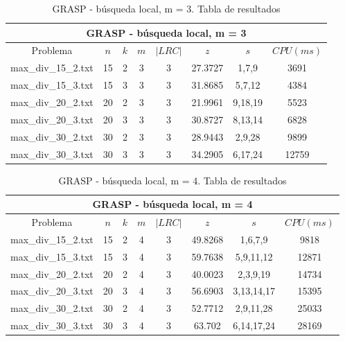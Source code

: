    \begin{table}[h]
   {\small
   \begin{center}
   \begin{tabular}{cccccccc}
      \multicolumn{8}{c}{GRASP - búsqueda local, m = 3} \\
      \hline
      Problema & $n$ & $k$ & $m$ & $|LRC|$ & $z$ & $s$ & $CPU(ms)$ \\
      \hline
      max\_div\_15\_2.txt & 15 & 2 & 3 & 3 & 27.3727 & 1,7,9 & 3691 \\
      max\_div\_15\_3.txt & 15 & 3 & 3 & 3 & 31.8685 & 5,7,12 & 4384 \\
      max\_div\_20\_2.txt & 20 & 2 & 3 & 3 & 21.9961 & 9,18,19 & 5523 \\
      max\_div\_20\_3.txt & 20 & 3 & 3 & 3 & 30.8727 & 8,13,14 & 6828 \\
      max\_div\_30\_2.txt & 30 & 2 & 3 & 3 & 28.9443 & 2,9,28 & 9899 \\
      max\_div\_30\_3.txt & 30 & 3 & 3 & 3 & 34.2905 & 6,17,24 & 12759 \\
      \hline
   \end{tabular}
   \end{center}
   }
   \caption{GRASP - búsqueda local, m = 3. Tabla de resultados}
   \end{table}

   \begin{table}[h]
   {\small
   \begin{center}
   \begin{tabular}{cccccccc}
      \multicolumn{8}{c}{GRASP - búsqueda local, m = 4} \\
      \hline
      Problema & $n$ & $k$ & $m$ & $|LRC|$ & $z$ & $s$ & $CPU(ms)$ \\
      \hline
      max\_div\_15\_2.txt & 15 & 2 & 4 & 3 & 49.8268 & 1,6,7,9 & 9818 \\
      max\_div\_15\_3.txt & 15 & 3 & 4 & 3 & 59.7638 & 5,9,11,12 & 12871 \\
      max\_div\_20\_2.txt & 20 & 2 & 4 & 3 & 40.0023 & 2,3,9,19 & 14734 \\
      max\_div\_20\_3.txt & 20 & 3 & 4 & 3 & 56.6903 & 3,13,14,17 & 15395 \\
      max\_div\_30\_2.txt & 30 & 2 & 4 & 3 & 52.7712 & 2,9,11,28 & 25033 \\
      max\_div\_30\_3.txt & 30 & 3 & 4 & 3 & 63.702 & 6,14,17,24 & 28169 \\
      \hline
   \end{tabular}
   \end{center}
   }
   \caption{GRASP - búsqueda local, m = 4. Tabla de resultados}
   \end{table}

